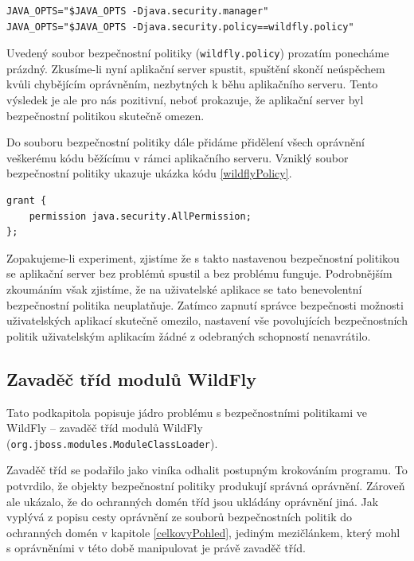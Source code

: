 \begin{lstlisting}[caption=Doplnění spouštěcího skriptu o použití správce bezpečnosti, label=wildflySeSM]
JAVA_OPTS="$JAVA_OPTS -Djava.security.manager"
JAVA_OPTS="$JAVA_OPTS -Djava.security.policy==wildfly.policy"
\end{lstlisting}

Uvedený soubor bezpečnostní politiky ({\tt wildfly.policy}) prozatím ponecháme prázdný.
Zkusíme-li nyní aplikační server spustit, spuštění skončí neúspěchem kvůli chybějícím oprávněním, nezbytných k běhu aplikačního serveru. Tento výsledek je ale pro nás pozitivní, neboť prokazuje, že aplikační server byl bezpečnostní politikou skutečně omezen.

Do souboru bezpečnostní politiky dále přidáme přidělení všech oprávnění veškerému kódu běžícímu v rámci aplikačního serveru. Vzniklý soubor bezpečnostní politiky ukazuje ukázka kódu \ref{wildflyPolicy}.

\begin{lstlisting}[caption=První testovací soubor bezpečnostní politiky, label=wildflyPolicy]
grant {
    permission java.security.AllPermission;
};
\end{lstlisting}

Zopakujeme-li experiment, zjistíme že s takto nastavenou bezpečnostní politikou se aplikační server bez problémů spustil a bez problému funguje.
Podrobnějším zkoumáním však zjistíme, že na uživatelské aplikace se tato benevolentní bezpečnostní politika neuplatňuje.
Zatímco zapnutí správce bezpečnosti možnosti uživatelských aplikací skutečně omezilo, nastavení vše povolujících bezpečnostních politik uživatelským
aplikacím žádné z odebraných schopností nenavrátilo.

\subsection{Zavaděč tříd modulů WildFly} \label{moduleClassLoader}

Tato podkapitola popisuje jádro problému s bezpečnostními politikami ve WildFly -- zavaděč tříd modulů WildFly ({\tt org.jboss.modules.ModuleClassLoader}).

Zavaděč tříd se podařilo jako viníka odhalit postupným krokováním programu.
To potvrdilo, že objekty bezpečnostní politiky produkují správná oprávnění.
Zároveň ale ukázalo, že do ochranných domén tříd jsou ukládány oprávnění jiná.
Jak vyplývá z popisu cesty oprávnění ze souborů bezpečnostních politik do ochranných domén v kapitole \ref{celkovyPohled},
jediným mezičlánkem, který mohl s oprávněními v této době manipulovat je právě zavaděč tříd.

